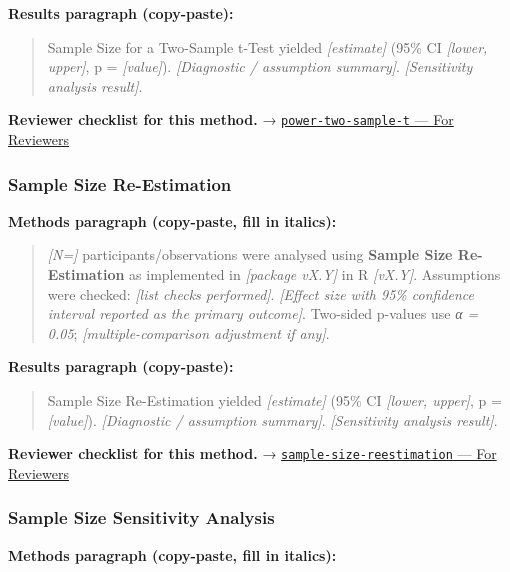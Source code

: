 \documentclass[
]{article}
\begin{document}
\textbf{Results paragraph (copy-paste):}

\begin{quote}
Sample Size for a Two-Sample t-Test yielded \emph{{[}estimate{]}} (95\%
CI \emph{{[}lower, upper{]}}, p = \emph{{[}value{]}}).
\emph{{[}Diagnostic / assumption summary{]}}. \emph{{[}Sensitivity
analysis result{]}}.
\end{quote}

\textbf{Reviewer checklist for this method.} →
\href{../chapters/05-power/power-two-sample-t.Rmd\#for-reviewers}{\texttt{power-two-sample-t}
--- For Reviewers}

\subsubsection{Sample Size
Re-Estimation}\label{sample-size-re-estimation}

\textbf{Methods paragraph (copy-paste, fill in italics):}

\begin{quote}
\emph{{[}N={]}} participants/observations were analysed using
\textbf{Sample Size Re-Estimation} as implemented in \emph{{[}package
vX.Y{]}} in R \emph{{[}vX.Y{]}}. Assumptions were checked: \emph{{[}list
checks performed{]}}. \emph{{[}Effect size with 95\% confidence interval
reported as the primary outcome{]}}. Two-sided p-values use \emph{α =
0.05}; \emph{{[}multiple-comparison adjustment if any{]}}.
\end{quote}

\textbf{Results paragraph (copy-paste):}

\begin{quote}
Sample Size Re-Estimation yielded \emph{{[}estimate{]}} (95\% CI
\emph{{[}lower, upper{]}}, p = \emph{{[}value{]}}). \emph{{[}Diagnostic
/ assumption summary{]}}. \emph{{[}Sensitivity analysis result{]}}.
\end{quote}

\textbf{Reviewer checklist for this method.} →
\href{../chapters/14-clinical/sample-size-reestimation.Rmd\#for-reviewers}{\texttt{sample-size-reestimation}
--- For Reviewers}

\subsubsection{Sample Size Sensitivity
Analysis}\label{sample-size-sensitivity-analysis}

\textbf{Methods paragraph (copy-paste, fill in italics):}
\end{document}
